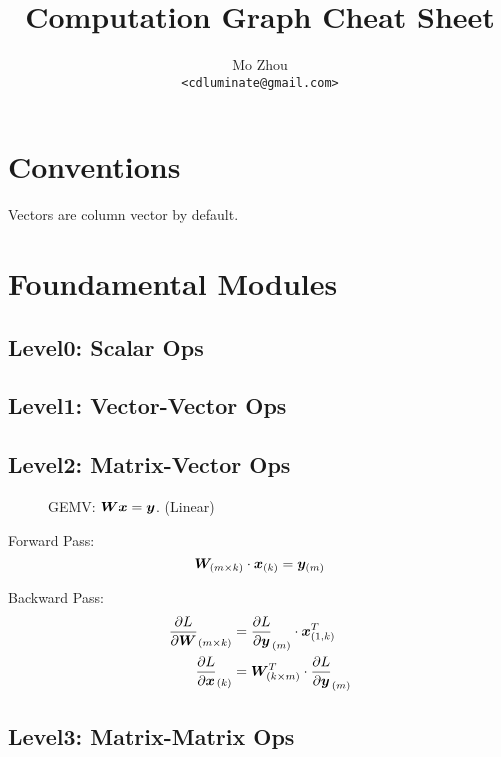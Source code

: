 \documentclass[9pt,twocolumn,times]{article}
\title{Computation Graph Cheat Sheet}
\author{Mo Zhou\\\small\texttt{<cdluminate@gmail.com>}}
\begin{document}
\maketitle

\section{Conventions}

Vectors are column vector by default.

\section{Foundamental Modules}

\subsection{Level0: Scalar Ops}

\subsection{Level1: Vector-Vector Ops}

\subsection{Level2: Matrix-Vector Ops}

\begin{figure}[h]
	\centering
	\resizebox{0.618\columnwidth}{!}{%
		
	}
	\caption{GEMV: ${\bm{W}} {\bm{x}} = {\bm{y}}$. (Linear)}
\end{figure}

	Forward Pass:
	\begin{equation}
		{\bm{W}}_{(m\times k)} \cdot {\bm{x}}_{(k)} = {\bm{y}}_{(m)}
	\end{equation}

	Backward Pass:
	\begin{align}
		\frac{\partial L}{\partial{\bm{W}}}_{(m\times k)} &=
		\frac{\partial L}{\partial{\bm{y}}}_{(m)} \cdot {\bm{x}}^T_{(1,k)}\\
		\frac{\partial L}{\partial{\bm{x}}}_{(k)} &=
		{\bm{W}}^T_{(k\times m)} \cdot \frac{\partial L}{\partial {\bm{y}}}_{(m)}
	\end{align}

\subsection{Level3: Matrix-Matrix Ops}
\end{document}
